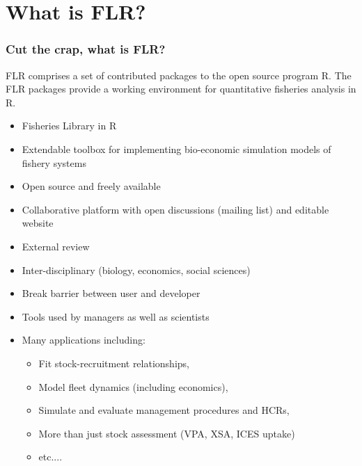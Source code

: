 \documentclass{beamer}%
\begin{document}
\section{What is FLR?}
\begin{frame}
  \frametitle{Cut the crap, what is FLR?}

FLR comprises a set of contributed packages to the open source program R. The FLR packages provide a working environment for quantitative fisheries analysis in R. 

      \begin{itemize}
	 \item<1-> Fisheries Library in R
	 \item<2-> Extendable toolbox for implementing bio-economic simulation models of fishery systems
	 \item<3-> Open source and freely available
	 \item<4-> Collaborative platform with open discussions (mailing list) and editable website
	 \item<5-> External review
	 \item<6-> Inter-disciplinary (biology, economics, social sciences)
	 \item<7-> Break barrier between user and developer
	 \item<8-> Tools used by managers as well as scientists
	 \item<9-> Many applications including:
	 \begin{itemize}
	    \item<9-> Fit stock-recruitment relationships,
	    \item<9-> Model fleet dynamics (including economics), 
	    \item<9-> Simulate and evaluate management procedures and HCRs, 
	    \item<9-> More than just stock assessment (VPA, XSA, ICES uptake)
	    \item<9-> etc....
	 \end{itemize}
   \end{itemize}

\end{frame}
\end{document}
